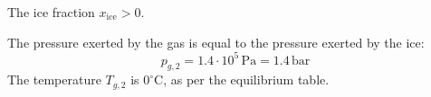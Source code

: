 The ice fraction \( x_{\text{ice}} > 0 \).  

The pressure exerted by the gas is equal to the pressure exerted by the ice:  
\[
p_{g,2} = 1.4 \cdot 10^5 \, \text{Pa} = 1.4 \, \text{bar}
\]  
The temperature \( T_{g,2} \) is \( 0^\circ\text{C} \), as per the equilibrium table.